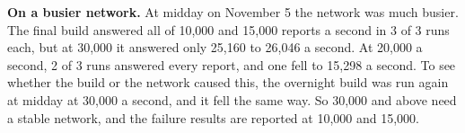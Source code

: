 \textbf{On a busier network.} At midday on November 5 the network was much busier. The final build answered all of 10,000 and 15,000 reports a second in 3 of 3 runs each, but at 30,000 it answered only 25,160 to 26,046 a second. At 20,000 a second, 2 of 3 runs answered every report, and one fell to 15,298 a second. To see whether the build or the network caused this, the overnight build was run again at midday at 30,000 a second, and it fell the same way. So 30,000 and above need a stable network, and the failure results are reported at 10,000 and 15,000.
